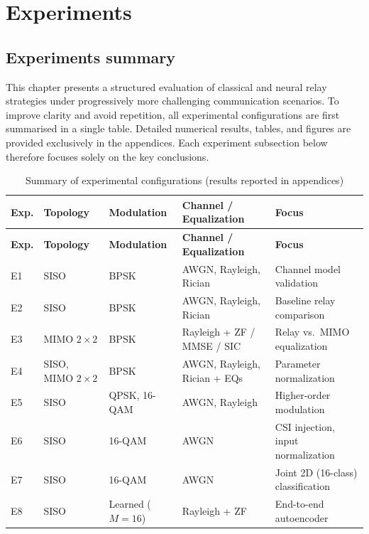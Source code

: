 \chapter{Experiments}\label{chap:experiments}

\section{Experiments summary}\label{sec:experiments-summary}

This chapter presents a structured evaluation of classical and neural relay strategies under progressively more challenging communication scenarios. 
To improve clarity and avoid repetition, all experimental configurations are first summarised in a single table.
Detailed numerical results, tables, and figures are provided exclusively in the appendices.
Each experiment subsection below therefore focuses solely on the key conclusions.

\begin{longtable}{p{0.6cm} p{2.2cm} p{2.1cm} p{3.6cm} p{3.9cm}}
\caption{Summary of experimental configurations (results reported in appendices)}
\label{tab:experiment-summary}\\
\hline
\textbf{Exp.} &
\textbf{Topology} &
\textbf{Modulation} &
\textbf{Channel / Equalization} &
\textbf{Focus} \\
\hline
\endfirsthead

\hline
\textbf{Exp.} &
\textbf{Topology} &
\textbf{Modulation} &
\textbf{Channel / Equalization} &
\textbf{Focus} \\
\hline
\endhead

E1 & SISO & BPSK &
AWGN, Rayleigh, Rician &
Channel model validation \\
\hline

E2 & SISO & BPSK &
AWGN, Rayleigh, Rician &
Baseline relay comparison \\
\hline

E3 & MIMO $2\times2$ & BPSK &
Rayleigh + ZF / MMSE / SIC &
Relay vs.\ MIMO equalization \\
\hline

E4 & SISO, MIMO $2\times2$ & BPSK &
AWGN, Rayleigh, Rician + EQs &
Parameter normalization \\
\hline

E5 & SISO & QPSK, 16-QAM &
AWGN, Rayleigh &
Higher-order modulation \\
\hline

E6 & SISO & 16-QAM &
AWGN &
CSI injection, input normalization \\
\hline

E7 & SISO & 16-QAM &
AWGN &
Joint 2D (16-class) classification \\
\hline

E8 & SISO & Learned ($M=16$) &
Rayleigh + ZF &
End-to-end autoencoder \\

\hline
\end{longtable}









